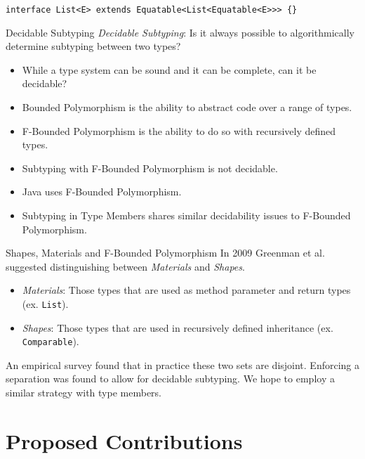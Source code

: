 \documentclass[dvipsnames]{beamer}
\begin{document}
\begin{lrbox}{\tmFBound}
\begin{lstlisting}[mathescape, style=customlang]
interface List<E> extends Equatable<List<Equatable<E>>> {}
\end{lstlisting}
\end{lrbox}

\begin{frame}{Decidable Subtyping}
\emph{Decidable Subtyping}: Is it always possible to algorithmically determine subtyping between two types?
\begin{itemize}
\item
While a type system can be sound and it can be complete, can it be decidable? 
\item
Bounded Polymorphism is the ability to abstract code over a range of types. 
\item
F-Bounded Polymorphism is the ability to do so with recursively defined types.
\item
Subtyping with F-Bounded Polymorphism is not decidable.
\item
Java uses F-Bounded Polymorphism.
\begin{block}{ }
\usebox{\tmFBound}
\end{block}
\item
Subtyping in Type Members shares similar decidability issues to F-Bounded Polymorphism.
\end{itemize}
\end{frame}

\begin{frame}{Shapes, Materials and F-Bounded Polymorphism}
In 2009 Greenman et al. suggested distinguishing between \emph{Materials} and \emph{Shapes}.
\begin{itemize}
\item
\emph{Materials}: Those types that are used as method parameter and return types (ex. \texttt{List}).
\item
\emph{Shapes}: Those types that are used in recursively defined inheritance (ex. \texttt{Comparable}).
\end{itemize}
An empirical survey found that in practice these two sets are disjoint. Enforcing a separation was found to allow for decidable subtyping. We hope to employ a similar strategy with type members.
\end{frame}

\section{Proposed Contributions}
\end{document}
